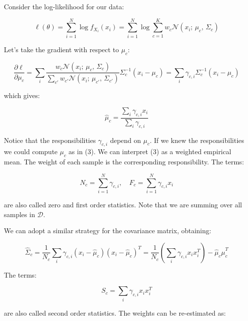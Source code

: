 Consider the log-likelihood for our data:


\begin{equation*}
\ell(\theta) = \sum_{i=1}^N \log f_{X_i}(x_i) = \sum_{i=1}^N \log \sum_{c=1}^K w_c \mathcal{N}(x_i;\, \mu_c,\, \Sigma_c)
\end{equation*}

Let's take the gradient with respect to $\mu_c$:


\begin{equation*}
\frac{\partial \ell}{\partial \mu_c} = \sum_i \frac{w_c \mathcal{N}(x_i;\, \mu_c,\, \Sigma_c)}{\sum_{c'} w_{c'} \mathcal{N}(x_i;\, \mu_{c'},\, \Sigma_{c'})} \Sigma_c^{-1}(x_i - \mu_c) = \sum_i \gamma_{c,i} \Sigma_c^{-1}(x_i - \mu_c)
\end{equation*}

which gives:


\begin{equation*}
\hat{\mu}_c = \frac{\sum_i \gamma_{c,i} x_i}{\sum_i \gamma_{c,i}} \tag{3}
\end{equation*}

Notice that the responsibilities $\gamma_{c,i}$ depend on $\mu_c$. If we knew the responsibilities we could compute $\mu_c$ as in (3). We can interpret (3) as a weighted empirical mean. The weight of each sample is the corresponding responsibility. The terms:


\begin{equation*}
N_c = \sum_{i=1}^N \gamma_{c,i}, \quad F_c = \sum_{i=1}^N \gamma_{c,i} x_i
\end{equation*}

are also called zero and first order statistics. Note that we are summing over all samples in $\mathcal{D}$.

We can adopt a similar strategy for the covariance matrix, obtaining:


\begin{equation*}
\hat{\Sigma}_c = \frac{1}{N_c} \sum_i \gamma_{c,i} (x_i - \hat{\mu}_c)(x_i - \hat{\mu}_c)^T = \frac{1}{N_c} \left( \sum_i \gamma_{c,i} x_i x_i^T \right) - \hat{\mu}_c \hat{\mu}_c^T
\end{equation*}

The terms:


\begin{equation*}
S_c = \sum_i \gamma_{c,i} x_i x_i^T
\end{equation*}

are also called second order statistics. The weights can be re-estimated as:


